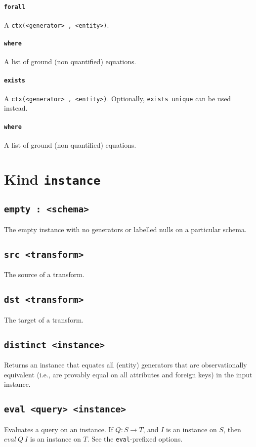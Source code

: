 \documentclass[10pt]{book}
\begin{document}
\subsubsection{{\tt forall}}
A {\tt ctx(<generator> , <entity>)}.

\subsubsection{{\tt where}}
A list of ground (non quantified) equations.

\subsubsection{{\tt exists}}
A {\tt ctx(<generator> , <entity>)}.  Optionally, {\tt exists unique} can be used instead.

\subsubsection{{\tt where}}
A list of ground (non quantified) equations.

\chapter{Kind {\tt instance}}
\section{{\tt empty : <schema>}}
The empty instance with no generators or labelled nulls on a particular schema.

\section{{\tt src <transform>}}
The source of a transform.

\section{{\tt dst <transform>}}
The target of a transform.

\section{{\tt distinct <instance>}}
Returns an instance that equates all (entity) generators that are observationally equivalent (i.e., are provably equal on all attributes and foreign keys) in the input instance.  

\section{{\tt eval <query> <instance>}}
Evaluates a query on an instance.  If $Q : S \to T$, and $I$ is an instance on $S$, then $eval \ Q \ I$ is an instance on $T$.
See the {\tt eval}-prefixed options.
\end{document}

